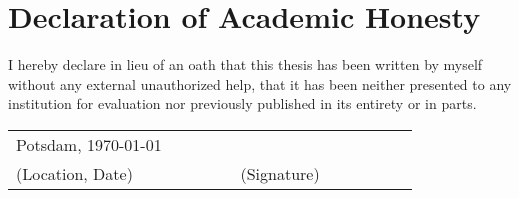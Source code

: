 \pagestyle{plain}

\chapter*{Declaration of Academic Honesty}

I hereby declare in lieu of an oath that this thesis has been written by myself
without any external unauthorized help, that it has been neither presented to any
institution for evaluation nor previously published in its entirety or in parts.


\vspace{1.5cm}

\noindent
\begin{tabular}{p{0.4\linewidth}p{0.1\linewidth}p{0.4\linewidth}}
{\Large Potsdam, \today}&&\\
\cline{1-1}
\cline{3-3}
(Location, Date)&&(Signature)
\end{tabular}
